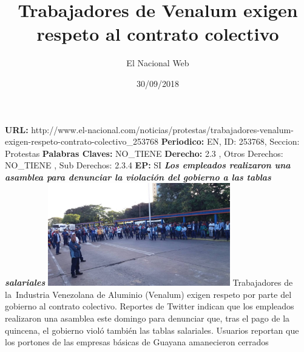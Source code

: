 \documentclass{article}%
\title{\textbf{Trabajadores de Venalum exigen respeto al contrato colectivo}}%
\author{El Nacional Web}%
\date{30/09/2018}%
\begin{document}
%
\normalsize%
\maketitle%
\textbf{URL: }%
http://www.el{-}nacional.com/noticias/protestas/trabajadores{-}venalum{-}exigen{-}respeto{-}contrato{-}colectivo\_253768\newline%
%
\textbf{Periodico: }%
EN, %
ID: %
253768, %
Seccion: %
Protestas\newline%
%
\textbf{Palabras Claves: }%
NO\_TIENE\newline%
%
\textbf{Derecho: }%
2.3%
, Otros Derechos: %
NO\_TIENE%
, Sub Derechos: %
2.3.4%
\newline%
%
\textbf{EP: }%
SI\newline%
\newline%
%
\textbf{\textit{Los empleados realizaron una asamblea para denunciar la violación del gobierno a las tablas salariales}}%
\newline%
\newline%
%
\includegraphics[width=300px]{146.jpg}%
\newline%
%
Trabajadores de la~Industria Venezolana de Aluminio (Venalum) exigen respeto por parte del gobierno al contrato colectivo.%
\newline%
%
Reportes de Twitter indican que los empleados realizaron una asamblea este domingo para denunciar que, tras el pago de la quincena, el gobierno violó también las tablas salariales.%
\newline%
%
Usuarios reportan que los portones de las empresas básicas de Guayana amanecieron cerrados%
\newline%
%
\end{document}
